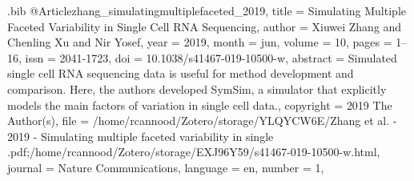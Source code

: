 \documentclass[
  table,
  10pt,
  a4paper]{article}
\begin{document}
\begin{filecontents}{\jobname.bib}
@Article{zhang_simulatingmultiplefaceted_2019,
	title = {Simulating Multiple Faceted Variability in Single Cell {{RNA}} Sequencing},
	author = {Xiuwei Zhang and Chenling Xu and Nir Yosef},
	year = {2019},
	month = {jun},
	volume = {10},
	pages = {1--16},
	issn = {2041-1723},
	doi = {10.1038/s41467-019-10500-w},
	abstract = {Simulated single cell RNA sequencing data is useful for method development and comparison. Here, the authors developed SymSim, a simulator that explicitly models the main factors of variation in single cell data.},
	copyright = {2019 The Author(s)},
	file = {/home/rcannood/Zotero/storage/YLQYCW6E/Zhang et al. - 2019 - Simulating multiple faceted variability in single .pdf;/home/rcannood/Zotero/storage/EXJ96Y59/s41467-019-10500-w.html},
	journal = {Nature Communications},
	language = {en},
	number = {1},
}
\end{filecontents}
\end{document}
